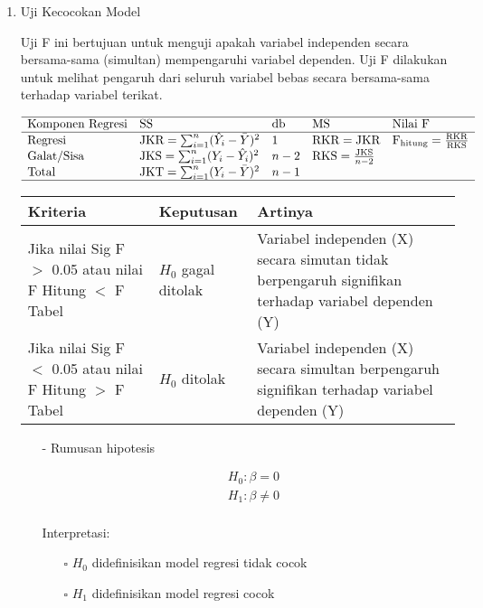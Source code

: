 \begin{enumerate}
\item Uji Kecocokan Model \\
\begin{sloppypar}
Uji F ini bertujuan untuk menguji apakah variabel independen secara bersama-sama (simultan) mempengaruhi variabel dependen. Uji F dilakukan untuk melihat pengaruh dari seluruh variabel bebas secara bersama-sama terhadap variabel terikat. 
\end{sloppypar}
$$\begin{array}{llllll}
    \hline 
    \text{Komponen Regresi} & \text{SS} & \text{db} & \text{MS} & \text{Nilai F} \\
    \hline 
    \text{Regresi} & \text{JKR} = \sum_{i=1}^{n}(\hat{Y}_i - \bar{Y})^2 & 1 & \text{RKR} = \text{JKR} & \text{F}_\text{hitung} = \frac{\text{RKR}}{\text{RKS}} \\
    \text{Galat/Sisa} & \text{JKS} = \sum_{i=1}^{n}(Y_i - \hat{Y}_i)^2 & n-2 & \text{RKS} = \frac{\text{JKS}}{n-2} \\
    \text{Total} & \text{JKT} = \sum_{i=1}^{n}(Y_i - \bar{Y})^2 & n-1 \\
    \hline
\end{array}$$
\begin{table}[h]
    \begin{tabular}{p{4cm} p{2.5cm} p{6cm}}
        \toprule
\textbf{Kriteria} & \textbf{Keputusan} & \textbf{Artinya} \\
        \midrule
Jika nilai Sig F $>$ 0.05 atau nilai F Hitung $<$ F Tabel
& $H_0$ gagal ditolak 
& Variabel independen (X) secara simutan tidak berpengaruh signifikan terhadap variabel dependen (Y) \\  
Jika nilai Sig F $<$ 0.05 atau nilai F Hitung $>$ F Tabel
& $H_0$ ditolak       
& Variabel independen (X) secara simultan berpengaruh signifikan terhadap variabel dependen (Y) \\
        \bottomrule
    \end{tabular}
\end{table}
\begin{test}{
    \begin{enumerate}
    \item[-] Rumusan hipotesis \\
    \begin{fleqn}[\parindent]
        \begin{equation*}
        \begin{split}
        &H_0 : \beta = 0 \\ 
        &H_1 : \beta \neq 0 \\
        \end{split}
        \end{equation*}
    \end{fleqn}
    Interpretasi:
    \begin{enumerate}
    \item[$\square$] $H_0$ didefinisikan model regresi tidak cocok
    \item[$\square$] $H_1$ didefinisikan model regresi cocok
    \end{enumerate}


\end{enumerate}}
\end{test}
\end{enumerate}
